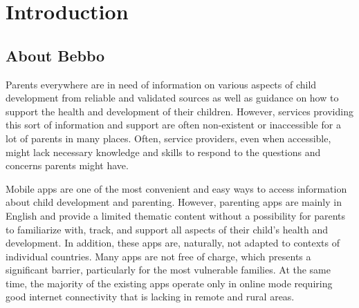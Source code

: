 \documentclass{article}
\begin{document}






\section{Introduction}

\subsection*{About Bebbo}
Parents everywhere are in need of information on various aspects of child development from reliable  and validated sources as well as guidance on how to support the health and development of their  children. However, services providing this sort of information and support are often non-existent or  inaccessible for a lot of parents in many places. Often, service providers, even when accessible, might  lack necessary knowledge and skills to respond to the questions and concerns parents might have.

Mobile apps are one of the most convenient and easy ways to access information about child  development and parenting. However, parenting apps are mainly in English and provide a limited  thematic content without a possibility for parents to familiarize with, track, and support all aspects of  their child’s health and development. In addition, these apps are, naturally, not adapted to contexts of  individual countries. Many apps are not free of charge, which presents a significant barrier, particularly  for the most vulnerable families. At the same time, the majority of the existing apps operate only in  online mode requiring good internet connectivity that is lacking in remote and rural areas.
\end{document}
